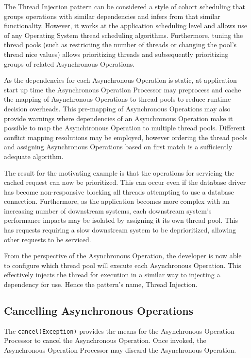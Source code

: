 \documentclass[prodmode]{style/acmlarge}
\begin{document}
The Thread Injection pattern can be considered a style of cohort scheduling
\cite{cohort} that groups operations with similar dependencies and infers from
that similar functionality.  However, it works at the application scheduling
level and allows use of any Operating System thread scheduling algorithms. 
Furthermore, tuning the thread pools (such as restricting the number of threads
or changing the pool's thread nice values) allows prioritizing threads and
subsequently prioritizing groups of related Asynchronous Operations.

As the dependencies for each Asynchronous Operation is static, at application
start up time the Asynchronous Operation Processor may preprocess and cache the
mapping of Asynchronous Operations to thread pools to reduce runtime decision
overheads.  This pre-mapping of Asynchronous Operations may also provide
warnings where dependencies of an Asynchronous Operation make it possible to map
the Asynchtronous Operation to multiple thread pools.  Different conflict
mapping resolutions may be employed, however ordering the thread pools and
assigning Asynchronous Operations based on first match is a sufficiently
adequate algorithm.

The result for the motivating example is that the operations for servicing the
cached request can now be prioritized.  This can occur even if the database
driver has become non-responsive blocking all threads attempting to use a
database connection.  Furthermore, as the application becomes more complex with
an increasing number of downstream systems, each downstream system's performance
impacts may be isolated by assigning it its own thread pool.  This has requests
requiring a slow downstream system to be deprioritized, allowing other requests
to be serviced.

From the perspective of the Asynchronous Operation, the developer is now able to
configure which thread pool will execute each Asynchronous Operation.  This
effectively injects the thread for execution in a similar way to injecting a
dependency for use.  Hence the pattern's name, Thread Injection.


\subsection{Cancelling Asynchronous Operations}

The \texttt{cancel(Exception)} provides the means for the Asynchronous Operation
Processor to cancel the Asynchronous Operation.  Once invoked, the Asynchronous
Operation Processor may discard the Asynchronous Operation.
\end{document}
